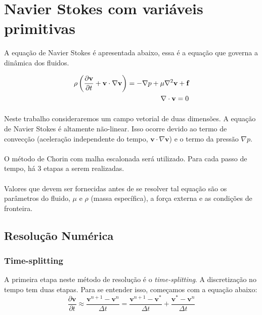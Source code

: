 \documentclass[poisson.tex]{subfiles}
\begin{document}
\section{Navier Stokes com variáveis primitivas}
A equação de Navier Stokes é apresentada abaixo, essa é a equação que governa a dinâmica dos fluidos.

\begin{eqnarray}
\NavierStokesEq{\textbf{v}}{\textbf{f}}{navierstokes}\\
\NScondition{\textbf{v}}
\end{eqnarray}

\paragraph{} Neste trabalho consideraremos um campo vetorial de duas dimensões. A equação de Navier Stokes é altamente não-linear. Isso ocorre devido ao termo de convecção (aceleração independente do tempo, $\textbf{v}\cdot \nabla\textbf{v}$) e o termo da pressão $\nabla p$. 

\paragraph{} O método de Chorin com malha escalonada será utilizado. Para cada passo de tempo, há 3 etapas a serem realizadas. 
\paragraph{} Valores que devem ser fornecidas antes de se resolver tal equação são os parâmetros do fluido, $\mu$ e $\rho$ (massa específica), a força externa e as condições de fronteira. 
\subsection{Resolução Numérica}
\subsubsection{Time-splitting} A primeira etapa neste método de resolução é o \textit{time-splitting}. A discretização no tempo tem duas etapas. Para se entender isso, começamos com a equação abaixo:
\begin{equation}
\frac{\partial \textbf{v}}{\partial t}\approx \frac{\textbf{v}^{n+1}-\textbf{v}^n}{\Delta t}=\frac{\textbf{v}^{n+1}-\textbf{v}^*}{\Delta t}+\frac{\textbf{v}^{*}-\textbf{v}^n}{\Delta t} 
\end{equation}
\end{document}

